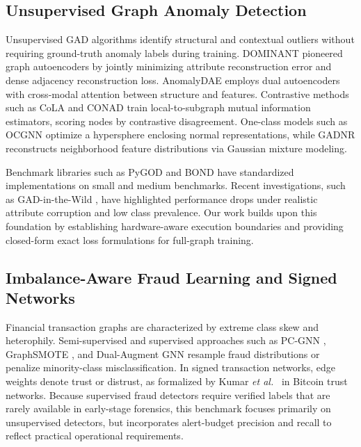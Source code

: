 \documentclass[11pt,a4paper]{article}
\newcommand{\etal}{\emph{et al.}}
\begin{document}
\subsection{Unsupervised Graph Anomaly Detection}
Unsupervised GAD algorithms identify structural and contextual outliers without requiring ground-truth anomaly labels during training. DOMINANT \cite{ding2019deep} pioneered graph autoencoders by jointly minimizing attribute reconstruction error and dense adjacency reconstruction loss. AnomalyDAE \cite{fan2020anomalydae} employs dual autoencoders with cross-modal attention between structure and features. Contrastive methods such as CoLA \cite{liu2022cola} and CONAD \cite{xu2022conad} train local-to-subgraph mutual information estimators, scoring nodes by contrastive disagreement. One-class models such as OCGNN \cite{wang2021ocgnn} optimize a hypersphere enclosing normal representations, while GADNR \cite{roy2024gadnr} reconstructs neighborhood feature distributions via Gaussian mixture modeling. 

Benchmark libraries such as PyGOD \cite{liu2024pygod} and BOND \cite{liu2022bond} have standardized implementations on small and medium benchmarks. Recent investigations, such as GAD-in-the-Wild \cite{zhou2026wild}, have highlighted performance drops under realistic attribute corruption and low class prevalence. Our work builds upon this foundation by establishing hardware-aware execution boundaries and providing closed-form exact loss formulations for full-graph training.

\subsection{Imbalance-Aware Fraud Learning and Signed Networks}
Financial transaction graphs are characterized by extreme class skew and heterophily. Semi-supervised and supervised approaches such as PC-GNN \cite{liu2021pcgnn}, GraphSMOTE \cite{zhao2021graphsmote}, and Dual-Augment GNN \cite{li2022dualaugment} resample fraud distributions or penalize minority-class misclassification. In signed transaction networks, edge weights denote trust or distrust, as formalized by Kumar \etal\ \cite{kumar2016edge} in Bitcoin trust networks. Because supervised fraud detectors require verified labels that are rarely available in early-stage forensics, this benchmark focuses primarily on unsupervised detectors, but incorporates alert-budget precision and recall to reflect practical operational requirements.
\end{document}
